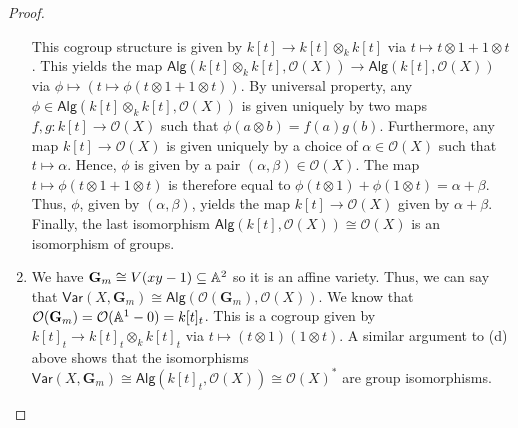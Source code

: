 \begin{proof}
\begin{enumerate}[label = (\alph*)]
        This cogroup structure is given by $k[t] \longrightarrow k[t] \otimes_k k[t]$ via $t \mapsto t \otimes 1 + 1 \otimes t$. This yields the map $\mathsf{Alg}(k[t] \otimes_k k[t], \mathcal O(X)) \longrightarrow \mathsf{Alg}(k[t], \mathcal O(X))$ via $\phi \mapsto (t \mapsto \phi(t \otimes 1 + 1 \otimes t))$. By universal property, any $\phi \in \mathsf{Alg}(k[t] \otimes_k k[t], \mathcal O(X))$ is given uniquely by two maps $f, g: k[t] \longrightarrow \mathcal O(X)$ such that $\phi(a \otimes b) = f(a) g(b)$. Furthermore, any map $k[t] \longrightarrow \mathcal O(X)$ is given uniquely by a choice of $\alpha \in \mathcal O(X)$ such that $t \mapsto \alpha$. Hence, $\phi$ is given by a pair $(\alpha, \beta) \in \mathcal O(X)$. The map $t \mapsto \phi(t \otimes 1 + 1 \otimes t)$ is therefore equal to $\phi(t \otimes 1) + \phi(1 \otimes t) = \alpha + \beta$. Thus, $\phi$, given by $(\alpha, \beta)$, yields the map $k[t] \longrightarrow \mathcal O(X)$ given by $\alpha + \beta$. Finally, the last isomorphism $\mathsf{Alg}(k[t], \mathcal O(X)) \cong \mathcal O(X)$ is an isomorphism of groups.

        \item We have $\mathbf G_m \cong V(xy - 1) \subseteq \mathbb A^2$ so it is an affine variety. Thus, we can say that $\mathsf{Var}(X, \mathbf G_m) \cong \mathsf{Alg}(\mathcal O(\mathbf G_m), \mathcal O(X))$. We know that $\mathcal O(\mathbf G_m) = \mathcal O(\mathbb A^1 - 0) = k[t]_t$. This is a cogroup given by $k[t]_t \longrightarrow k[t]_t \otimes_k k[t]_t$ via $t \mapsto (t \otimes 1)(1 \otimes t)$. A similar argument to (d) above shows that the isomorphisms $\mathsf{Var}(X, \mathbf G_m) \cong \mathsf{Alg}(k[t]_t, \mathcal O(X)) \cong \mathcal O(X)^*$ are group isomorphisms.
    \end{enumerate}
\end{proof}
